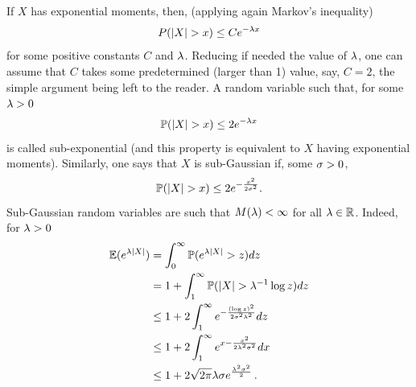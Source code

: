 If $X$ has exponential moments, then, (applying again Markov's inequality)
\[
P(|X| > x) \leq C e^{-\lambda x}
\]
for some positive constants $C$ and $\lambda$. Reducing if needed the value of $\lambda$, one can assume that $C$ takes some predetermined (larger than 1) value, say, $C=2$, the simple argument being left to the reader. A random variable such that, for some $\lambda>0$ 
\[
\bm{\mathbb P}(|X| > x) \leq 2 e^{-\lambda x}
\]
is called sub-exponential (and this property is equivalent to $X$ having exponential moments). Similarly, one says that $X$ is sub-Gaussian if, some $\sigma >0$, 
\begin{equation}
\label{eq:subgauss}
\bm{\mathbb P}(|X| > x) \leq 2 e^{- \frac{x^2}{2\sigma^2}}.
\end{equation}
Sub-Gaussian random variables are such that $M(\lambda) < \infty$ for all $\lambda\in {\mathbb{R}}$. Indeed, for $\lambda>0$
\begin{align*}
\bm{\mathbb E}(e^{\lambda |X|}) &= \int_0^\infty \bm{\mathbb P}(e^{\lambda |X|} > z) dz \\
&= 1 + \int_1^\infty \bm{\mathbb P}(|X| > \lambda^{-1} \log z) dz\\
& \leq 1 + 2 \int_1^\infty e^{-\frac{(\log z)^2}{2\sigma^2\lambda^2}} dz\\
& \leq 1 + 2 \int_1^\infty e^{x - \frac{x^2}{2\lambda^2\sigma^2}} dx\\
&\leq 1 +  2\sqrt{2\pi} \lambda \sigma e^{\frac{\lambda^2\sigma^2}2}\,.
\end{align*}

